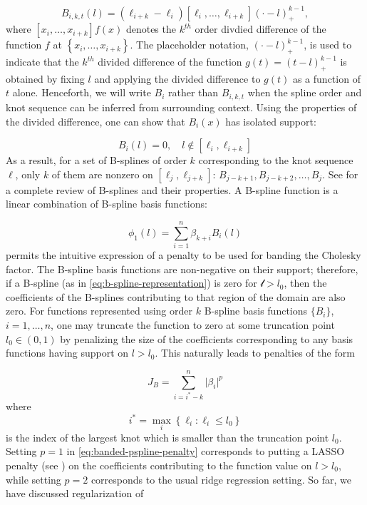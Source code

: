 \documentclass[12pt]{article}
\theoremstyle{definition}
\begin{document}
\begin{equation} \label{eq:bspline_definition}
B_{i,k,t}\left(l\right) = \left(\ell_{i+k}-\ell_i\right)\left[\ell_i,\dots,\ell_{i+k}\right]\left(\cdot -l \right)_+^{k-1},
\end{equation}  
\noindent
where $\left[ x_i,\dots,x_{i+k} \right] f\left(x\right)$ denotes the $k^{th}$ order divdied difference of the function $f$ at $\left\{ x_i,\dots,x_{i+k} \right\}$. The placeholder notation, $\left(\cdot - l\right)_+^{k-1}$, is used to indicate that the $k^{th}$ divided difference of the function $g\left(t \right) = \left(t-l\right)^{k-1}_+$ is obtained by fixing $l$ and applying the divided difference to $g\left(t \right)$ as a function of $t$ alone. Henceforth, we will write $B_i$ rather than $B_{i,k,t}$ when the spline order and knot sequence can be inferred from surrounding context. Using the properties of the divided difference, one can show that  $B_i\left(x\right)$ has isolated support:

\[
B_i\left(l\right) = 0, \quad l \not \in \left[\ell_{i},\ell_{i+k}\right]
\]
\noindent
As a result, for a set of B-splines of order $k$ corresponding to the knot sequence $\ell$, only $k$ of them are nonzero on $\left[\ell_{j},\ell_{j+k}\right]$: $B_{j-k+1},B_{j-k+2},\dots,B_{j}$. See \citet{de1978practical} for a complete review of B-splines and their properties. A B-spline function is a linear combination of B-spline basis functions:

\begin{equation} \label{eq:b-spline-representation}
\phi_1\left(l\right) =  \sum_{i=1}^n \beta_{k+i} B_{i}\left(l\right)
\end{equation}
\noindent
permits the intuitive expression of a penalty to be used for banding the Cholesky factor. The B-spline basis functions are non-negative on their support; therefore, if a B-spline (as in \ref{eq:b-spline-representation}) is zero for $\mathscr{l} > l_0$, then the coefficients of the B-splines contributing to that region of the domain are also zero. For functions represented using order $k$ B-spline basis functions $\lbrace B_i \rbrace$, $i=1,\dots,n$, one may truncate the function to zero at some truncation point $l_0 \in \left(0,1\right)$ by penalizing the size of the coefficients corresponding to any basis functions having support on $l > l_0$. This naturally leads to penalties of the form

\begin{equation} \label{eq:banded-pspline-penalty}
J_{B} = \sum_{ i=i^* -k }^n \vert \beta_i \vert^p
\end{equation}
\noindent
where
\[
i^* = \max\limits_{i} \left\{ \ell_i: \ell_i \le l_0 \right\}
\]
is the index of the largest knot which is smaller than the truncation point $l_0$. Setting $p=1$ in \ref{eq:banded-pspline-penalty} corresponds to putting a LASSO penalty (see \citet{tibshirani1996regression}) on the coefficients contributing to the function value on $l > l_0$, while setting $p=2$ corresponds to the usual ridge regression setting. So far, we have discussed regularization of  
\end{document}
